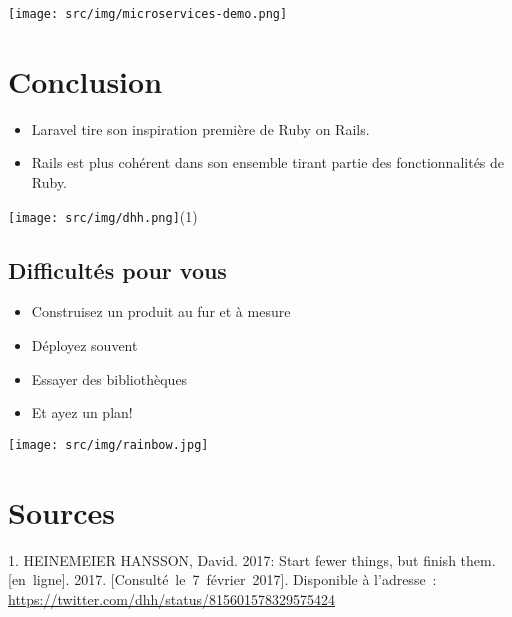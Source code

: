 \texttt{[image: src/img/microservices-demo.png]}

\hypertarget{conclusion}{%
\section{Conclusion}\label{conclusion}}

\begin{itemize}
\tightlist
\item
  Laravel tire son inspiration première de Ruby on Rails.
\item
  Rails est plus cohérent dans son ensemble tirant partie des
  fonctionnalités de Ruby.
\end{itemize}

\texttt{[image: src/img/dhh.png]}(1)

\hypertarget{difficultuxe9s-pour-vous}{%
\subsection{Difficultés pour vous}\label{difficultuxe9s-pour-vous}}

\begin{itemize}
\tightlist
\item
  Construisez un produit au fur et à mesure
\item
  Déployez souvent
\item
  Essayer des bibliothèques
\item
  Et ayez un plan!
\end{itemize}

\texttt{[image: src/img/rainbow.jpg]}

\begin{otherlanguage}{english}

\end{otherlanguage}

\hypertarget{sources}{%
\section*{Sources}\label{sources}}

\hypertarget{refs}{}
\leavevmode\hypertarget{ref-dhh:2017}{}%
1. HEINEMEIER HANSSON, David. 2017: Start fewer things, but finish them.
{[}en~ligne{]}. 2017. {[}Consulté~le~7~février~2017{]}. Disponible à
l'adresse~: \url{https://twitter.com/dhh/status/815601578329575424}
